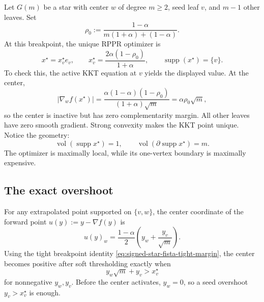 Let $G(m)$ be a star with center $w$ of degree $m\ge2$, seed leaf $v$, and
$m-1$ other leaves.  Set
\begin{equation}
  \rho_0
  :=\frac{1-\alpha}{m(1+\alpha)+(1-\alpha)}.
  \label{eq:signed-star-fista-rho0}
\end{equation}
At this breakpoint, the unique RPPR optimizer is
\begin{equation}
  x^\star=x_v^\star e_v,
  \qquad
  x_v^\star=\frac{2\alpha(1-\rho_0)}{1+\alpha},
  \qquad
  \operatorname{supp}(x^\star)=\{v\}.
  \label{eq:signed-star-fista-optimum}
\end{equation}
To check this, the active KKT equation at $v$ yields the displayed value.
At the center,
\begin{equation}
  |\nabla_w f(x^\star)|
  =\frac{\alpha(1-\alpha)(1-\rho_0)}
          {(1+\alpha)\sqrt m}
  =\alpha\rho_0\sqrt m,
  \label{eq:signed-star-fista-tight-margin}
\end{equation}
so the center is inactive but has zero complementarity margin.  All other
leaves have zero smooth gradient.  Strong convexity makes the KKT point
unique.  Notice the geometry:
\begin{equation}
  \operatorname{vol}(\operatorname{supp}x^\star)=1,
  \qquad
  \operatorname{vol}(\partial\operatorname{supp}x^\star)=m.
  \label{eq:signed-star-fista-core-boundary}
\end{equation}
The optimizer is maximally local, while its one-vertex boundary is maximally
expensive.

\subsection{The exact overshoot}

For any extrapolated point supported on $\{v,w\}$, the center coordinate of
the forward point $u(y):=y-\nabla f(y)$ is
\begin{equation}
  u(y)_w
  =\frac{1-\alpha}{2}
      \left(y_w+\frac{y_v}{\sqrt m}\right).
  \label{eq:signed-star-fista-forward-center}
\end{equation}
Using the tight breakpoint identity
\eqref{eq:signed-star-fista-tight-margin}, the center becomes positive after
soft thresholding exactly when
\begin{equation}
  y_w\sqrt m+y_v>x_v^\star
  \label{eq:signed-star-fista-activation-criterion}
\end{equation}
for nonnegative $y_w,y_v$.  Before the center activates, $y_w=0$, so a seed
overshoot $y_v>x_v^\star$ is enough.


